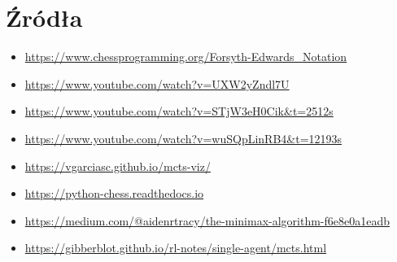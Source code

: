 \section*{Źródła}
\begin{itemize}
    \item \url{https://www.chessprogramming.org/Forsyth-Edwards_Notation}
    \item \url{https://www.youtube.com/watch?v=UXW2yZndl7U}
    \item \url{https://www.youtube.com/watch?v=STjW3eH0Cik&t=2512s}
    \item \url{https://www.youtube.com/watch?v=wuSQpLinRB4&t=12193s}
    \item \url{https://vgarciasc.github.io/mcts-viz/}
    \item \url{https://python-chess.readthedocs.io}
    \item \url{https://medium.com/@aidenrtracy/the-minimax-algorithm-f6e8e0a1eadb}
    \item \url{https://gibberblot.github.io/rl-notes/single-agent/mcts.html}
\end{itemize}